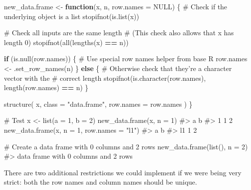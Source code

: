 \documentclass[
]{krantz}
\makeatletter
\newenvironment{Shaded}{\begin{snugshade}}{\end{snugshade}}
\newcommand{\CommentTok}[1]{\textcolor[rgb]{0.56,0.35,0.01}{\textit{#1}}}
\newcommand{\ControlFlowTok}[1]{\textcolor[rgb]{0.13,0.29,0.53}{\textbf{#1}}}
\newcommand{\DataTypeTok}[1]{\textcolor[rgb]{0.13,0.29,0.53}{#1}}
\newcommand{\DecValTok}[1]{\textcolor[rgb]{0.00,0.00,0.81}{#1}}
\newcommand{\KeywordTok}[1]{\textcolor[rgb]{0.13,0.29,0.53}{\textbf{#1}}}
\newcommand{\NormalTok}[1]{#1}
\newcommand{\OperatorTok}[1]{\textcolor[rgb]{0.81,0.36,0.00}{\textbf{#1}}}
\newcommand{\OtherTok}[1]{\textcolor[rgb]{0.56,0.35,0.01}{#1}}
\newcommand{\StringTok}[1]{\textcolor[rgb]{0.31,0.60,0.02}{#1}}
\newenvironment{kframe}{%
\medskip{}
\setlength{\fboxsep}{.8em}
 \def\at@end@of@kframe{}%
 \ifinner\ifhmode%
  \def\at@end@of@kframe{\end{minipage}}%
  \begin{minipage}{\columnwidth}%
 \fi\fi%
 \def\FrameCommand##1{\hskip\@totalleftmargin \hskip-\fboxsep
 \colorbox{shadecolor}{##1}\hskip-\fboxsep
     \hskip-\linewidth \hskip-\@totalleftmargin \hskip\columnwidth}%
 \MakeFramed {\advance\hsize-\width
   \@totalleftmargin\z@ \linewidth\hsize
   \@setminipage}}%
 {\par\unskip\endMakeFramed%
 \at@end@of@kframe}
\renewenvironment{Shaded}{\begin{kframe}}{\end{kframe}}
\renewcommand{\KeywordTok} [1]{\textcolor[rgb]{0.00,0.44,0.13}{{#1}}}
\renewcommand{\DataTypeTok}[1]{\textcolor[rgb]{0.56,0.13,0.00}{{#1}}}
\renewcommand{\DecValTok}  [1]{\textcolor[rgb]{0.25,0.63,0.44}{{#1}}}
\renewcommand{\StringTok}  [1]{\textcolor[rgb]{0.25,0.44,0.63}{{#1}}}
\renewcommand{\CommentTok} [1]{\textcolor[rgb]{0.38,0.63,0.69}{{#1}}}
\renewcommand{\OtherTok}   [1]{\textcolor[rgb]{0.00,0.44,0.13}{{#1}}}
\renewcommand{\NormalTok}  [1]{{#1}}
\makeatother
\begin{document}
\begin{Shaded}
\begin{Highlighting}[]
\NormalTok{new_data.frame <-}\StringTok{ }\ControlFlowTok{function}\NormalTok{(x, n, }\DataTypeTok{row.names =} \OtherTok{NULL}\NormalTok{) \{}
  \CommentTok{# Check if the underlying object is a list}
  \KeywordTok{stopifnot}\NormalTok{(}\KeywordTok{is.list}\NormalTok{(x))}
  
  \CommentTok{# Check all inputs are the same length}
  \CommentTok{# (This check also allows that x has length 0)}
  \KeywordTok{stopifnot}\NormalTok{(}\KeywordTok{all}\NormalTok{(}\KeywordTok{lengths}\NormalTok{(x) }\OperatorTok{==}\StringTok{ }\NormalTok{n))}
  
  \ControlFlowTok{if}\NormalTok{ (}\KeywordTok{is.null}\NormalTok{(row.names)) \{}
    \CommentTok{# Use special row names helper from base R}
\NormalTok{    row.names <-}\StringTok{ }\KeywordTok{.set_row_names}\NormalTok{(n)}
\NormalTok{  \} }\ControlFlowTok{else}\NormalTok{ \{}
    \CommentTok{# Otherwise check that they're a character vector with the }
    \CommentTok{# correct length}
    \KeywordTok{stopifnot}\NormalTok{(}\KeywordTok{is.character}\NormalTok{(row.names), }\KeywordTok{length}\NormalTok{(row.names) }\OperatorTok{==}\StringTok{ }\NormalTok{n)}
\NormalTok{  \}}
  
  \KeywordTok{structure}\NormalTok{(}
\NormalTok{    x,}
    \DataTypeTok{class =} \StringTok{"data.frame"}\NormalTok{,}
    \DataTypeTok{row.names =}\NormalTok{ row.names}
\NormalTok{  )}
\NormalTok{\}}

\CommentTok{# Test}
\NormalTok{x <-}\StringTok{ }\KeywordTok{list}\NormalTok{(}\DataTypeTok{a =} \DecValTok{1}\NormalTok{, }\DataTypeTok{b =} \DecValTok{2}\NormalTok{)}
\KeywordTok{new_data.frame}\NormalTok{(x, }\DataTypeTok{n =} \DecValTok{1}\NormalTok{)}
\CommentTok{#>   a b}
\CommentTok{#> 1 1 2}
\KeywordTok{new_data.frame}\NormalTok{(x, }\DataTypeTok{n =} \DecValTok{1}\NormalTok{, }\DataTypeTok{row.names =} \StringTok{"l1"}\NormalTok{)}
\CommentTok{#>    a b}
\CommentTok{#> l1 1 2}

\CommentTok{# Create a data frame with 0 columns and 2 rows}
\KeywordTok{new_data.frame}\NormalTok{(}\KeywordTok{list}\NormalTok{(), }\DataTypeTok{n =} \DecValTok{2}\NormalTok{)}
\CommentTok{#> data frame with 0 columns and 2 rows}
\end{Highlighting}
\end{Shaded}

There are two additional restrictions we could implement if we were being very strict: both the row names and column names should be unique.
\end{document}

